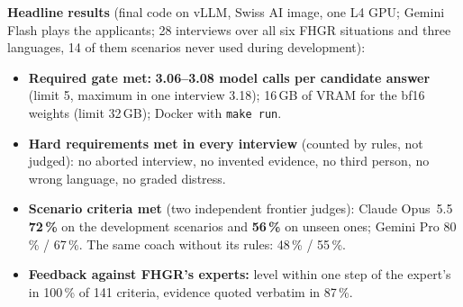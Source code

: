 \documentclass[10pt,a4paper]{article}
\newcommand{\devOpus}{72}        %
\newcommand{\hoOpus}{56}         %
\newcommand{\devGem}{80}         %
\newcommand{\hoGem}{67}
\newcommand{\callsDev}{3.06}
\newcommand{\callsHo}{3.08}
\newcommand{\callsMax}{3.18}
\newcommand{\preOpus}{48}        %
\newcommand{\preGem}{55}
\begin{document}
\begin{keybox}
\textbf{Headline results} (final code on vLLM, Swiss AI image, one L4 GPU; Gemini Flash plays the applicants; 28
interviews over all six FHGR situations and three languages, 14 of them scenarios never used during development):
\begin{itemize}
\item \textbf{Required gate met:} \textbf{\callsDev{}--\callsHo{} model calls per candidate answer} (limit 5, maximum in one interview
\callsMax{}); 16\,GB of VRAM for the bf16 weights (limit 32\,GB); Docker with \texttt{make run}.
\item \textbf{Hard requirements met in every interview} (counted by rules, not judged): no aborted interview, no
invented evidence, no third person, no wrong language, no graded distress.
\item \textbf{Scenario criteria met} (two independent frontier judges): Claude Opus~5.5 \textbf{\devOpus\,\%} on the development
scenarios and \textbf{\hoOpus\,\%} on unseen ones; Gemini Pro \devGem\,\% / \hoGem\,\%. The same coach without its rules: \preOpus\,\% / \preGem\,\%.
\item \textbf{Feedback against FHGR's experts:} level within one step of the expert's in 100\,\% of 141 criteria,
evidence quoted verbatim in 87\,\%.
\end{itemize}
\end{keybox}

\end{document}
